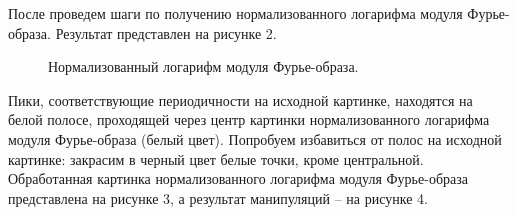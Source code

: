 \documentclass[a5paper, 10pt]{article}
\theoremstyle{definition}
\theoremstyle{plain}
\theoremstyle{remark}
\begin{document}
После проведем шаги по получению нормализованного логарифма модуля Фурье-образа. Результат представлен на рисунке 2.
\begin{figure}[h!]
\caption{Нормализованный логарифм модуля Фурье-образа.}
\end{figure}
\newpage
Пики, соответствующие периодичности на исходной картинке, находятся на белой полосе, проходящей через центр картинки нормализованного логарифма модуля Фурье-образа (белый цвет). Попробуем избавиться от полос на исходной картинке: закрасим в черный цвет белые точки, кроме центральной. Обработанная картинка нормализованного логарифма модуля Фурье-образа представлена на рисунке 3, а результат манипуляций -- на рисунке 4.
\end{document}
